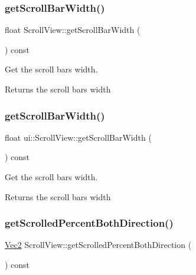 \subsubsection{\texorpdfstring{get\+Scroll\+Bar\+Width()}{getScrollBarWidth()}\hspace{0.1cm}{\footnotesize\ttfamily [1/2]}}
{\footnotesize\ttfamily float Scroll\+View\+::get\+Scroll\+Bar\+Width (\begin{DoxyParamCaption}{ }\end{DoxyParamCaption}) const}



Get the scroll bar\textquotesingle{}s width. 

\begin{DoxyReturn}{Returns}
the scroll bar\textquotesingle{}s width 
\end{DoxyReturn}
\mbox{\label{classui_1_1ScrollView_a7fda1c7e75712c999b597e8ebfb84111}} 
\subsubsection{\texorpdfstring{get\+Scroll\+Bar\+Width()}{getScrollBarWidth()}\hspace{0.1cm}{\footnotesize\ttfamily [2/2]}}
{\footnotesize\ttfamily float ui\+::\+Scroll\+View\+::get\+Scroll\+Bar\+Width (\begin{DoxyParamCaption}{ }\end{DoxyParamCaption}) const}



Get the scroll bar\textquotesingle{}s width. 

\begin{DoxyReturn}{Returns}
the scroll bar\textquotesingle{}s width 
\end{DoxyReturn}
\mbox{\label{classui_1_1ScrollView_a2d412ef2a2f554df353d44ef00b685c8}} 
\subsubsection{\texorpdfstring{get\+Scrolled\+Percent\+Both\+Direction()}{getScrolledPercentBothDirection()}}
{\footnotesize\ttfamily \hyperlink{classVec2}{Vec2} Scroll\+View\+::get\+Scrolled\+Percent\+Both\+Direction (\begin{DoxyParamCaption}{ }\end{DoxyParamCaption}) const}

